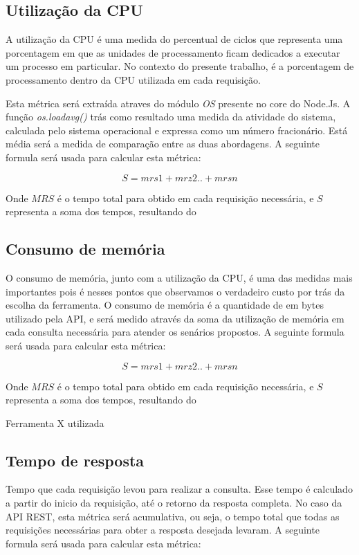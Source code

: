 \subsection*{Utilização da CPU}

A utilização da CPU é uma medida do percentual de ciclos que representa uma porcentagem em que as unidades de processamento ficam dedicados a executar um processo em particular. No contexto do presente trabalho, é a porcentagem de processamento dentro da CPU utilizada em cada requisição.

Esta métrica será extraída atraves do módulo \textit{OS} presente no \textrm{core} do Node.Js. A função \textit{os.loadavg()} trás como resultado uma medida da atividade do sistema, calculada pelo sistema operacional e expressa como um número fracionário. Está média será a medida de comparação entre as duas abordagens. A seguinte formula será usada para calcular esta métrica: 

$$S=mrs1+mrz2..+mrsn$$

Onde $MRS$ é o tempo total para obtido em cada requisição necessária, e $S$ representa a soma dos tempos, resultando do 

\subsection*{Consumo de memória}

O consumo de memória, junto com a utilização da CPU, é uma das medidas mais importantes pois é nesses pontos que observamos o verdadeiro custo por trás da escolha da ferramenta. O consumo de memória é a quantidade de em bytes utilizado pela API, e será medido através da soma da utilização de memória em cada consulta necessária para atender os senários propostos. A seguinte formula será usada para calcular esta métrica: 

$$S=mrs1+mrz2..+mrsn$$

Onde $MRS$ é o tempo total para obtido em cada requisição necessária, e $S$ representa a soma dos tempos, resultando do 

Ferramenta X utilizada

\subsection*{Tempo de resposta}

Tempo que cada requisição levou para realizar a consulta. Esse tempo é calculado a partir do inicio da requisição, até o retorno da resposta completa. No caso da API REST, esta métrica será acumulativa, ou seja, o tempo total que todas as requisições necessárias para obter a resposta desejada levaram. A seguinte formula será usada para calcular esta métrica: 

